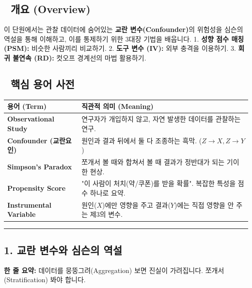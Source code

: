 \documentclass[11pt,a4paper]{book}
\theoremstyle{definition}
\begin{document}
\subsection*{📌 개요 (Overview)}
이 단원에서는 관찰 데이터에 숨어있는 \textbf{교란 변수(Confounder)}의 위험성을 심슨의 역설을 통해 이해하고, 이를 통제하기 위한 3대장 기법을 배웁니다.
1. \textbf{성향 점수 매칭 (PSM):} 비슷한 사람끼리 비교하기.
2. \textbf{도구 변수 (IV):} 외부 충격을 이용하기.
3. \textbf{회귀 불연속 (RD):} 컷오프 경계선의 마법 활용하기.

\subsection*{📝 핵심 용어 사전}
\begin{table}[h]
\centering
\begin{tabularx}{\textwidth}{|p{}|X|}
\hline
\textbf{용어 (Term)} & \textbf{직관적 의미 (Meaning)} \\
\hline
\textbf{Observational Study} & 연구자가 개입하지 않고, 자연 발생한 데이터를 관찰하는 연구. \\
\hline
\textbf{Confounder (교란요인)} & 원인과 결과 뒤에서 둘 다 조종하는 흑막. ($Z \to X, Z \to Y$) \\
\hline
\textbf{Simpson's Paradox} & 쪼개서 볼 때와 합쳐서 볼 때 결과가 정반대가 되는 기이한 현상. \\
\hline
\textbf{Propensity Score} & "이 사람이 처치(약/쿠폰)를 받을 확률". 복잡한 특성을 점수 하나로 요약. \\
\hline
\textbf{Instrumental Variable} & 원인($X$)에만 영향을 주고 결과($Y$)에는 직접 영향을 안 주는 제3의 변수. \\
\hline
\end{tabularx}
\end{table}

\vspace{0.5cm}\hrule\vspace{0.5cm}

\subsection{1. 교란 변수와 심슨의 역설}


\begin{conceptbox}[title={개념 1: 통계의 착시 현상}]
\textbf{한 줄 요약:} 데이터를 뭉뚱그려(Aggregation) 보면 진실이 가려집니다. 쪼개서(Stratification) 봐야 합니다.
\end{conceptbox}
\end{document}
